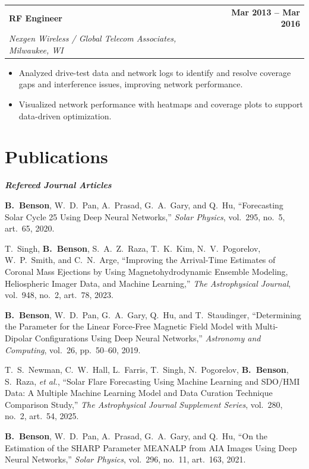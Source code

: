 \documentclass[11pt,letterpaper]{article}
\makeatletter
\newcommand{\cventry}[3]{%
  \par\vspace{0.6ex}%
  \noindent\begin{tabularx}{\textwidth}{@{}X r@{}}
    \textbf{#1} & \textbf{#3}\\
    \textit{#2} & \\
  \end{tabularx}%
  \vspace{-0.4ex}%
}
\newcommand{\me}{\textbf{B.~Benson}}
\makeatother
\begin{document}
\cventry{RF Engineer}{Nexgen Wireless / Global Telecom Associates, Milwaukee, WI}{Mar 2013 -- Mar 2016}
\begin{itemize}
  \item Analyzed drive-test data and network logs to identify and resolve coverage gaps and interference issues, improving network performance.
  \item Visualized network performance with heatmaps and coverage plots to support data-driven optimization.
\end{itemize}

\section{Publications}

\textbf{\itshape Refereed Journal Articles}
\begin{pubs}
  \item \me, W.~D.~Pan, A.~Prasad, G.~A.~Gary, and Q.~Hu, ``Forecasting Solar Cycle 25 Using Deep Neural Networks,'' \textit{Solar Physics}, vol.~295, no.~5, art.~65, 2020.
  \item T.~Singh, \me, S.~A.~Z.~Raza, T.~K.~Kim, N.~V.~Pogorelov, W.~P.~Smith, and C.~N.~Arge, ``Improving the Arrival-Time Estimates of Coronal Mass Ejections by Using Magnetohydrodynamic Ensemble Modeling, Heliospheric Imager Data, and Machine Learning,'' \textit{The Astrophysical Journal}, vol.~948, no.~2, art.~78, 2023.
  \item \me, W.~D.~Pan, G.~A.~Gary, Q.~Hu, and T.~Staudinger, ``Determining the Parameter for the Linear Force-Free Magnetic Field Model with Multi-Dipolar Configurations Using Deep Neural Networks,'' \textit{Astronomy and Computing}, vol.~26, pp.~50--60, 2019.
  \item T.~S.~Newman, C.~W.~Hall, L.~Farris, T.~Singh, N.~Pogorelov, \me, S.~Raza, \textit{et al.}, ``Solar Flare Forecasting Using Machine Learning and SDO/HMI Data: A Multiple Machine Learning Model and Data Curation Technique Comparison Study,'' \textit{The Astrophysical Journal Supplement Series}, vol.~280, no.~2, art.~54, 2025.
  \item \me, W.~D.~Pan, A.~Prasad, G.~A.~Gary, and Q.~Hu, ``On the Estimation of the SHARP Parameter MEANALP from AIA Images Using Deep Neural Networks,'' \textit{Solar Physics}, vol.~296, no.~11, art.~163, 2021.
\end{pubs}
\end{document}
